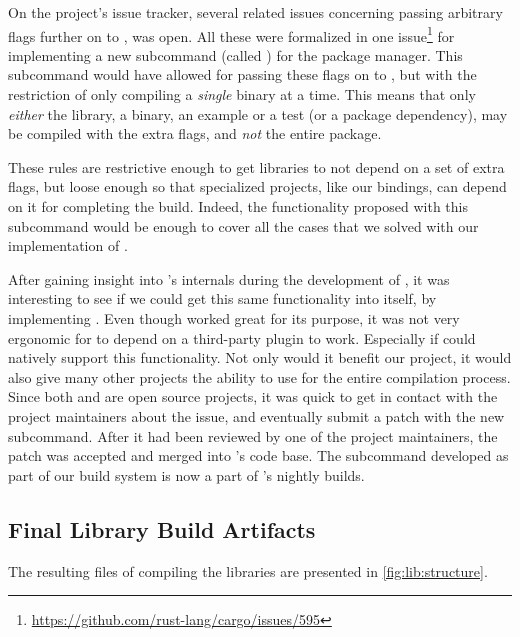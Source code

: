 On the {\cargo} project's issue tracker, several related issues concerning passing arbitrary flags further on to {\rustc}, was open.
All these were formalized in one issue\footnote{\url{https://github.com/rust-lang/cargo/issues/595}} for implementing a new subcommand (called ) for the package manager.
This subcommand would have allowed for passing these flags on to {\rustc}, but with the restriction of only compiling a \emph{single} binary at a time.
This means that only \emph{either} the library, a binary, an example or a test (or a package dependency), may be compiled with the extra flags, and \emph{not} the entire package.

These rules are restrictive enough to get libraries to not depend on a set of extra flags, but loose enough so that specialized projects, like our bindings, can depend on it for completing the build.
Indeed, the functionality proposed with this subcommand would be enough to cover all the cases that we solved with our implementation of .

After gaining insight into {\cargo}'s internals during the development of , it was interesting to see if we could get this same functionality into {\cargo} itself, by implementing .
Even though  worked great for its purpose, it was not very ergonomic for {\rg} to depend on a third-party plugin to work.
Especially if {\cargo} could natively support this functionality.
Not only would it benefit our project, it would also give many other {\rust} projects the ability to use {\cargo} for the entire compilation process.
Since both {\rust} and {\cargo} are open source projects, it was quick to get in contact with the project maintainers about the issue, and eventually submit a patch with the new subcommand.
After it had been reviewed by one of the project maintainers, the patch was accepted and merged into {\cargo}'s code base.
The subcommand developed as part of our build system is now a part of {\rust}'s nightly builds.

\subsection{Final Library Build Artifacts}

The resulting files of compiling the libraries are presented in \autoref{fig:lib:structure}.

